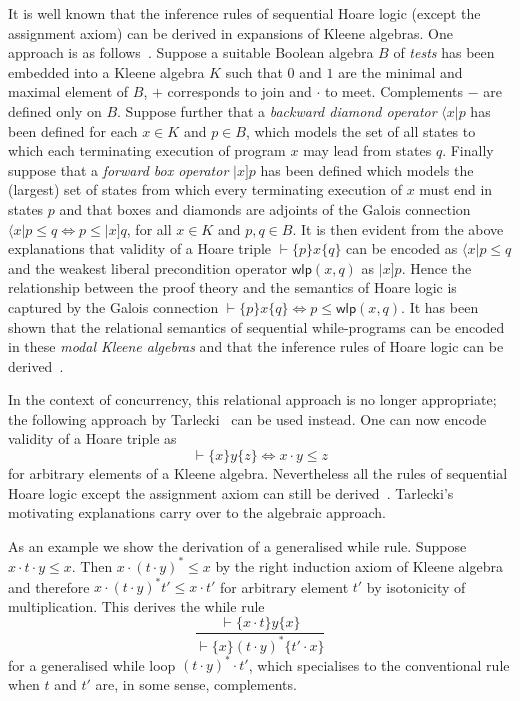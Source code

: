 \documentclass{llncs}
\begin{document}
It is well known that the inference rules of sequential Hoare logic
(except the assignment axiom) can be derived in expansions of Kleene
algebras. One approach is as
follows~\cite{moller_algebras_2006}. Suppose a suitable Boolean
algebra $B$ of \emph{tests} has been embedded into a Kleene algebra
$K$ such that $0$ and $1$ are the minimal and maximal element of $B$,
$+$ corresponds to join and $\cdot$ to meet. Complements $-$ are
defined only on $B$. Suppose further that a \emph{backward diamond
  operator} $\langle x|p$ has been defined for each $x\in K$ and $p\in
B$, which models the set of all states to which each terminating
execution of program $x$ may lead from states $q$. Finally suppose
that a \emph{forward box operator} $|x]p$ has been defined which
models the (largest) set of states from which every terminating
execution of $x$ must end in states $p$ and that boxes and diamonds
are adjoints of the Galois connection $\langle x|p \le q
\Leftrightarrow p \le |x]q$, for all $x\in K$ and $p,q\in B$. It is
then evident from the above explanations that validity of a Hoare
triple $\vdash \{p\}x\{q\}$ can be encoded as $\langle x|p \le q$ and
the weakest liberal precondition operator $\mathsf{wlp}(x,q)$ as
$|x]p$. Hence the relationship between the proof theory and the
semantics of Hoare logic is captured by the Galois connection $
\vdash\{p\}x\{q\} \Leftrightarrow p \le \mathsf{wlp}(x,q)$. It has
been shown that the relational semantics of sequential while-programs
can be encoded in these \emph{modal Kleene algebras} and that the
inference rules of Hoare logic can be
derived~\cite{moller_algebras_2006}.

In the context of concurrency, this relational approach is no longer
appropriate; the following approach by
Tarlecki~\cite{tarlecki_language_1985} can be used instead. One can
now encode validity of a Hoare triple as
\begin{equation*}
  \vdash \{x\}y\{z\} \Leftrightarrow x \cdot y \le z
\end{equation*}
for arbitrary elements of a Kleene algebra. Nevertheless all the
rules of sequential Hoare logic except the assignment axiom can still
be derived~\cite{hoare_concurrent_2011}. Tarlecki's motivating
explanations carry over to the algebraic approach.

As an example we show the derivation of a generalised while
rule. Suppose $x\cdot t\cdot y\le x$. Then $x\cdot (t\cdot y)^\ast \le
x$ by the right induction axiom of Kleene algebra and therefore
$x\cdot (t\cdot y)^\ast t'\le x\cdot t'$ for arbitrary element $t'$ by
isotonicity of multiplication. This derives the while rule
\begin{equation*}
  \frac{\vdash \{x\cdot t\}y\{x\}}{\vdash \{x\}(t\cdot y)^\ast\{t'\cdot x\}}
\end{equation*}
for a generalised while loop $(t\cdot y)^\ast\cdot t'$, which
specialises to the conventional rule when $t$ and $t'$ are, in some
sense, complements.
\end{document}

